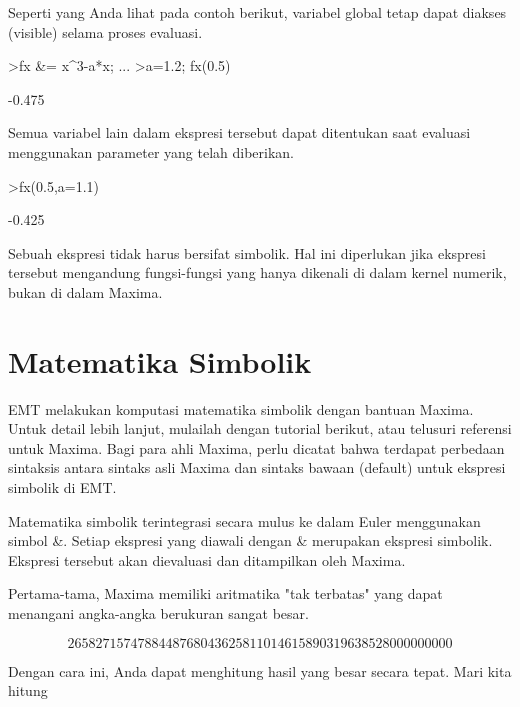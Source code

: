 \documentclass{article}
\newenvironment{eulernotebook}{\par}{\par}
\newcommand{\eulerheading}[1]{\section{#1}}
\newenvironment{eulercomment}{\par\medskip}{\par\medskip}
\newenvironment{eulerformula}{}{}
\begin{document}
\begin{eulernotebook}
\begin{eulercomment}
Seperti yang Anda lihat pada contoh berikut, variabel global tetap
dapat diakses (visible) selama proses evaluasi.
\end{eulercomment}
\begin{eulerprompt}
>fx &= x^3-a*x;  ...
>a=1.2; fx(0.5)
\end{eulerprompt}
\begin{euleroutput}
  -0.475
\end{euleroutput}
\begin{eulercomment}
Semua variabel lain dalam ekspresi tersebut dapat ditentukan saat
evaluasi menggunakan parameter yang telah diberikan.
\end{eulercomment}
\begin{eulerprompt}
>fx(0.5,a=1.1)
\end{eulerprompt}
\begin{euleroutput}
  -0.425
\end{euleroutput}
\begin{eulercomment}
Sebuah ekspresi tidak harus bersifat simbolik. Hal ini diperlukan jika
ekspresi tersebut mengandung fungsi-fungsi yang hanya dikenali di
dalam kernel numerik, bukan di dalam Maxima.

\begin{eulercomment}
\eulerheading{Matematika Simbolik}
\begin{eulercomment}
EMT melakukan komputasi matematika simbolik dengan bantuan Maxima.
Untuk detail lebih lanjut, mulailah dengan tutorial berikut, atau
telusuri referensi untuk Maxima. Bagi para ahli Maxima, perlu dicatat
bahwa terdapat perbedaan sintaksis antara sintaks asli Maxima dan
sintaks bawaan (default) untuk ekspresi simbolik di EMT.

Matematika simbolik terintegrasi secara mulus ke dalam Euler
menggunakan simbol \&. Setiap ekspresi yang diawali dengan \& merupakan
ekspresi simbolik. Ekspresi tersebut akan dievaluasi dan ditampilkan
oleh Maxima.

Pertama-tama, Maxima memiliki aritmatika "tak terbatas" yang dapat
menangani angka-angka berukuran sangat besar.
\end{eulercomment}
\begin{eulerformula}
\[
2658271574788448768043625811014615890319638528000000000
\]
\end{eulerformula}
\begin{eulercomment}
Dengan cara ini, Anda dapat menghitung hasil yang besar secara tepat.
Mari kita hitung


\end{eulercomment}
\end{eulercomment}
\end{eulercomment}
\end{eulernotebook}
\end{document}
